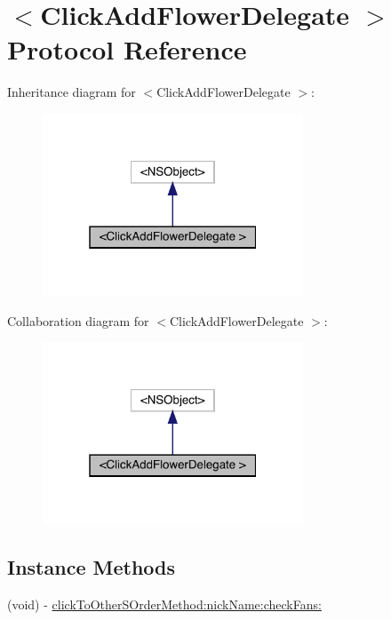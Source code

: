 \hypertarget{protocol_click_add_flower_delegate_01-p}{}\section{$<$Click\+Add\+Flower\+Delegate $>$ Protocol Reference}
\label{protocol_click_add_flower_delegate_01-p}


Inheritance diagram for $<$Click\+Add\+Flower\+Delegate $>$\+:\nopagebreak
\begin{figure}[H]
\begin{center}
\leavevmode
\includegraphics[width=220pt]{protocol_click_add_flower_delegate_01-p__inherit__graph}
\end{center}
\end{figure}


Collaboration diagram for $<$Click\+Add\+Flower\+Delegate $>$\+:\nopagebreak
\begin{figure}[H]
\begin{center}
\leavevmode
\includegraphics[width=220pt]{protocol_click_add_flower_delegate_01-p__coll__graph}
\end{center}
\end{figure}
\subsection*{Instance Methods}
\begin{DoxyCompactItemize}
\item 
(void) -\/ \mbox{\hyperlink{protocol_click_add_flower_delegate_01-p_a7fdcbbeb6b194284443b1771b8c939d6}{click\+To\+Other\+S\+Order\+Method\+:nick\+Name\+:check\+Fans\+:}}
\end{DoxyCompactItemize}


